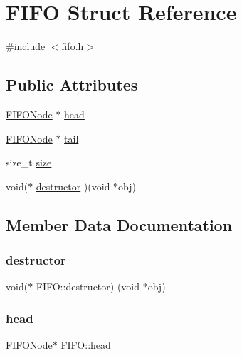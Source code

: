 \hypertarget{structFIFO}{}\section{F\+I\+FO Struct Reference}
\label{structFIFO}


{\ttfamily \#include $<$fifo.\+h$>$}

\subsection*{Public Attributes}
\begin{DoxyCompactItemize}
\item 
\hyperlink{structFIFONode}{F\+I\+F\+O\+Node} $\ast$ \hyperlink{structFIFO_a3f3bd65accf737dc2ab6befdca648f1f}{head}
\item 
\hyperlink{structFIFONode}{F\+I\+F\+O\+Node} $\ast$ \hyperlink{structFIFO_aca03b48cff8af692bed09691e5e7f9e7}{tail}
\item 
size\+\_\+t \hyperlink{structFIFO_a29f539fa6ee65c7b230588f7a1928d82}{size}
\item 
void($\ast$ \hyperlink{structFIFO_a96b10bc40f2092741f884049828bff5e}{destructor} )(void $\ast$obj)
\end{DoxyCompactItemize}


\subsection{Member Data Documentation}
\hypertarget{structFIFO_a96b10bc40f2092741f884049828bff5e}{}\label{structFIFO_a96b10bc40f2092741f884049828bff5e} 
\subsubsection{\texorpdfstring{destructor}{destructor}}
{\footnotesize\ttfamily void($\ast$ F\+I\+F\+O\+::destructor) (void $\ast$obj)}

\hypertarget{structFIFO_a3f3bd65accf737dc2ab6befdca648f1f}{}\label{structFIFO_a3f3bd65accf737dc2ab6befdca648f1f} 
\subsubsection{\texorpdfstring{head}{head}}
{\footnotesize\ttfamily \hyperlink{structFIFONode}{F\+I\+F\+O\+Node}$\ast$ F\+I\+F\+O\+::head}

